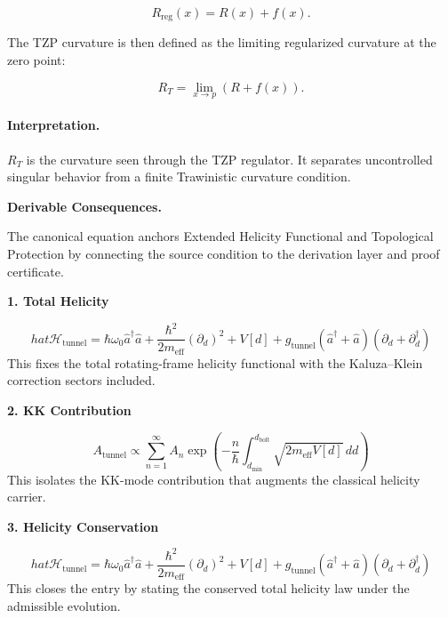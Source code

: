 \begin{equation}
R_{\mathrm{reg}}(x)=R(x)+f(x).
\end{equation}

The TZP curvature is then defined as the limiting regularized curvature at the zero point:

\begin{equation}
\boxed{
R_T
=
\lim_{x\to p}
\left(
R+f(x)
\right).
}
\end{equation}

\paragraph{Interpretation.}
$R_T$ is the curvature seen through the TZP regulator. It separates uncontrolled singular behavior from a finite Trawinistic curvature condition.

\par\vspace{0.35em}
\noindent\textbf{Derivable Consequences.}\quad
\begingroup
\footnotesize
\raggedright
The canonical equation anchors Extended Helicity Functional and Topological Protection by connecting the source condition to the derivation layer and proof certificate.
\par\endgroup

\noindent\textbf{1. Total Helicity}\par
\[
hat{\mathcal{H}}_{\text{tunnel}} = \hbar \omega_0 \hat{a}^\dagger \hat{a} + \frac{\hbar^2}{2m_{\text{eff}}} (\partial_d)^2 + V[d] + g_{\text{tunnel}} (\hat{a}^\dagger + \hat{a})(\partial_d + \partial_d^\dagger)
\]
\noindent This fixes the total rotating-frame helicity functional with the Kaluza--Klein correction sectors included.\par
\noindent\textbf{2. KK Contribution}\par
\[
A_{\text{tunnel}} \propto \sum_{n=1}^{\infty} A_n \exp\left(-\frac{n}{\hbar} \int_{d_{\min}}^{d_{\text{bolt}}} \sqrt{2m_{\text{eff}} V[d]} \, dd\right)
\]
\noindent This isolates the KK-mode contribution that augments the classical helicity carrier.\par
\noindent\textbf{3. Helicity Conservation}\par
\[
hat{\mathcal{H}}_{\text{tunnel}} = \hbar \omega_0 \hat{a}^\dagger \hat{a} + \frac{\hbar^2}{2m_{\text{eff}}} (\partial_d)^2 + V[d] + g_{\text{tunnel}} (\hat{a}^\dagger + \hat{a})(\partial_d + \partial_d^\dagger)
\]
\noindent This closes the entry by stating the conserved total helicity law under the admissible evolution.\par

